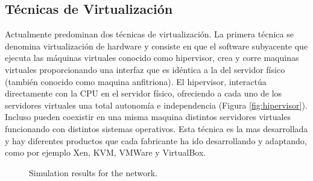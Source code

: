 \documentclass[conference, spanish]{IEEEtran}
\begin{document}
\subsection{Técnicas de Virtualización}
Actualmente predominan dos técnicas de virtualización. La primera técnica se denomina virtualización de hardware y consiste en que el software subyacente que ejecuta las máquinas virtuales conocido como hipervisor, crea y corre maquinas virtuales proporcionando una interfaz que es idéntica a la del servidor físico (también conocido como maquina anfitriona). El hipervisor, interactúa directamente con la CPU en el servidor físico, ofreciendo a cada uno de los servidores virtuales una total autonomía e independencia (Figura \ref{fig:hipervisor}). Incluso pueden coexistir en una misma maquina distintos servidores virtuales funcionando con distintos sistemas operativos. Esta técnica es la mas desarrollada y hay diferentes productos que cada fabricante ha ido desarrollando y adaptando, como por ejemplo Xen, KVM, VMWare y VirtualBox.\\

\begin{figure}[!t]
\centering
{}
\hfil
{}
\caption{Simulation results for the network.}
\label{fig_sim}
\end{figure}
\end{document}
